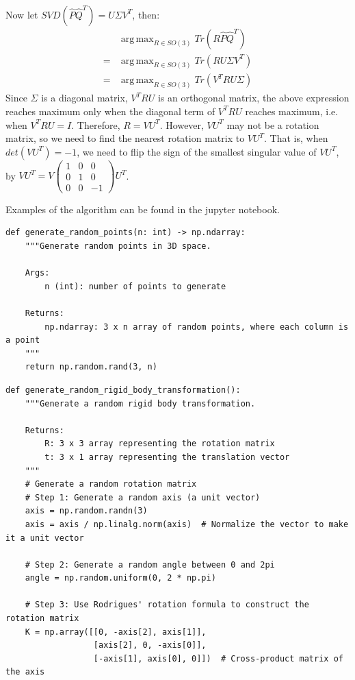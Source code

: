 \documentclass[conference,onecolumn]{IEEEtran}
\DeclareMathOperator*{\argmax}{arg\,max}
\begin{document}
\begin{enumerate}[label=\arabic{enumi}.]
\begin{align*}
          \end{align*}
          Now let $SVD(\hat{P}\hat{Q}^T) = U \Sigma V^T$, then:
          \begin{align*}
                & \argmax_{R \in SO(3)} Tr(R\hat{P}\hat{Q}^T) \\
              = & \argmax_{R \in SO(3)} Tr(R U \Sigma V^T)    \\
              = & \argmax_{R \in SO(3)} Tr(V^T R U \Sigma)
          \end{align*}
          Since $\Sigma$ is a diagonal matrix, $V^T R U$ is an orthogonal matrix, the above expression reaches maximum only when the diagonal term of $V^T R U$ reaches maximum, i.e. when $V^T R U = I$.
          Therefore, $R = VU^T$.
          However, $VU^T$ may not be a rotation matrix, so we need to find the nearest rotation matrix to $VU^T$.
          That is, when $det(VU^T) = -1$, we need to flip the sign of the smallest singular value of $VU^T$, by $VU^T = V \begin{pmatrix} 1 & 0 & 0 \\ 0 & 1 & 0 \\ 0 & 0 & -1 \end{pmatrix} U^T$.

          Examples of the algorithm can be found in the jupyter notebook.
          \begin{lstlisting}
def generate_random_points(n: int) -> np.ndarray:
    """Generate random points in 3D space.

    Args:
        n (int): number of points to generate

    Returns:
        np.ndarray: 3 x n array of random points, where each column is a point
    """
    return np.random.rand(3, n)
          \end{lstlisting}
          \begin{lstlisting}
def generate_random_rigid_body_transformation():
    """Generate a random rigid body transformation.

    Returns:
        R: 3 x 3 array representing the rotation matrix
        t: 3 x 1 array representing the translation vector
    """
    # Generate a random rotation matrix
    # Step 1: Generate a random axis (a unit vector)
    axis = np.random.randn(3)
    axis = axis / np.linalg.norm(axis)  # Normalize the vector to make it a unit vector

    # Step 2: Generate a random angle between 0 and 2pi
    angle = np.random.uniform(0, 2 * np.pi)

    # Step 3: Use Rodrigues' rotation formula to construct the rotation matrix
    K = np.array([[0, -axis[2], axis[1]],
                  [axis[2], 0, -axis[0]],
                  [-axis[1], axis[0], 0]])  # Cross-product matrix of the axis


\end{lstlisting}
\end{enumerate}
\end{document}

